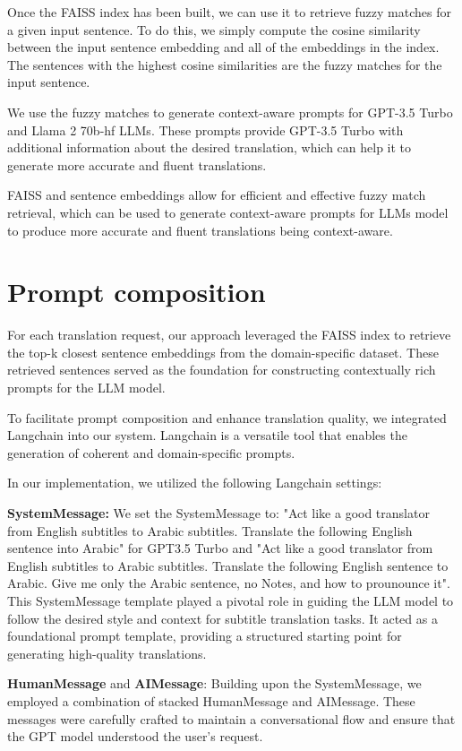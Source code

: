 \documentclass[twocolumn]{article}
\begin{document}
Once the FAISS index has been built, we can use it to retrieve fuzzy matches for a given input sentence. To do this, we simply compute the cosine similarity between the input sentence embedding and all of the embeddings in the index. The sentences with the highest cosine similarities are the fuzzy matches for the input sentence.

We use the fuzzy matches to generate context-aware prompts for GPT-3.5 Turbo and Llama 2 70b-hf LLMs. These prompts provide GPT-3.5 Turbo with additional information about the desired translation, which can help it to generate more accurate and fluent translations.

FAISS and sentence embeddings allow for efficient and effective fuzzy match retrieval, which can be used to generate context-aware prompts for LLMs model to produce more accurate and fluent translations being context-aware.


\section{Prompt composition}

For each translation request, our approach leveraged the FAISS index to retrieve the top-k closest sentence embeddings from the domain-specific dataset. These retrieved sentences served as the foundation for constructing contextually rich prompts for the LLM model.


To facilitate prompt composition and enhance translation quality, we integrated Langchain\cite{langchain} into our system. Langchain is a versatile tool that enables the generation of coherent and domain-specific prompts. 

In our implementation, we utilized the following Langchain settings:

\textbf{SystemMessage:} We set the SystemMessage to: "Act like a good translator from English subtitles to Arabic subtitles. Translate the following English sentence into Arabic" for GPT3.5 Turbo and "Act like a good translator from English subtitles to Arabic subtitles. Translate the following English sentence to Arabic. Give me only the Arabic sentence, no Notes, and how to prounounce it". This SystemMessage template played a pivotal role in guiding the LLM model to follow the desired style and context for subtitle translation tasks. It acted as a foundational prompt template, providing a structured starting point for generating high-quality translations.


\textbf{HumanMessage} and \textbf{AIMessage}: Building upon the SystemMessage, we employed a combination of stacked HumanMessage and AIMessage. These messages were carefully crafted to maintain a conversational flow and ensure that the GPT model understood the user’s request.
\end{document}
